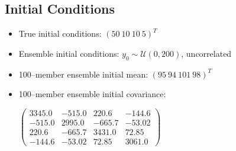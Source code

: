 \documentclass[fleqn, letterpaper]{amsart}
\begin{document}
\subsection{Initial Conditions}

\begin{itemize}
\item True initial conditions: $(50\ 10\ 10\ 5)^T$
\item Ensemble initial conditions: $y_0\sim\mathcal{U}(0,200)$, uncorrelated
\item 100--member ensemble initial mean: $(95\ 94\ 101\ 98)^T$
\item 100--member ensemble initial covariance:

$\left(\begin{array}{cccc} 3345.0 & -515.0 & 220.6 & -144.6\\ -515.0 & 2995.0 & -665.7 & -53.02\\ 220.6 & -665.7 & 3431.0 & 72.85\\ -144.6 & -53.02 & 72.85 & 3061.0 \end{array}\right)$
\end{itemize}
\end{document}

